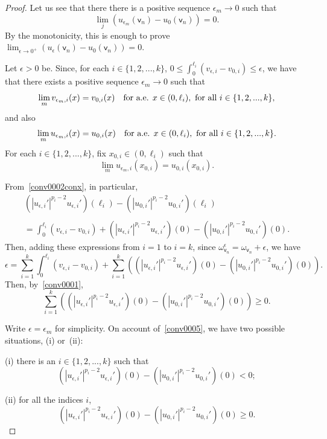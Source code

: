 \documentclass[reqno,12pt]{amsart}
\def\v{\mathsf{v}}	%
\numberwithin{equation}{section} %
\begin{document}
\begin{proof}
Let us see that there there is a positive sequence $\epsilon_{m}\to 0$ such that 
 $$\lim_{j}\left(u_{\epsilon_{m}}(\v_n)-u_0(\v_n)\right)=0.$$
By  the monotonicity, this is enough to prove $\lim_{\epsilon\to 0^+}\left(u_\epsilon(\v_n)-u_0(\v_n)\right)=0$.

Let $\epsilon>0$ be. Since, for each $i\in\{1,2,...,k\}$, $\displaystyle 0\le\int_0^{\ell_i} (v_{\epsilon,i} - v_{0,i})\le \epsilon$, we have that there exists  a positive sequence $  \epsilon_m\to 0$ such that  $$\lim_m v_{\epsilon_m,i}(x)= v_{0,i}(x)\quad\hbox{for a.e. } x\in (0,\ell_i),\ \hbox{for all } i\in\{1,2,...,k\},$$
and also
$$\lim_m u_{\epsilon_m,i}(x)= u_{0,i}(x)\quad\hbox{for a.e. } x\in (0,\ell_i), \ \hbox{for all } i\in\{1,2,...,k\}.$$
For each $i\in\{1,2,...,k\}$, fix $x_{0,i}\in (0,\ell_i)$ such that 
$$\lim_m u_{\epsilon_m,i}(x_{0,i})= u_{0,i}(x_{0,i}).$$

From~\eqref{conv0002conx}, in particular, 
\begin{equation}\label{conv0002}
\begin{array}{c}
\displaystyle
(|u_{\epsilon,i}'|^{p_i-2}u_{\epsilon,i}') (\ell_i) -  (|u_{0,i}'|^{p_i-2}u_{0,i}') (\ell_i)   
\\ \\
\displaystyle= \int_0^{\ell_i} (v_{\epsilon,i} - v_{0,i})+  (|u_{\epsilon,i}'|^{p_i-2}u_{\epsilon,i}') (0) -  (|u_{0,i}'|^{p_i-2}u_{0,i}') (0).
\end{array}
\end{equation}
Then, adding these expressions from $i=1$ to $i=k$,  since $\omega^\epsilon_{\v_n}=\omega_{\v_n}+\epsilon$, we have
$$\epsilon   
=\sum_{i=1}^k\int_0^{\ell_i} (v_{\epsilon,i} - v_{0,i})+ \sum_{i=1}^k\left( (|u_{\epsilon,i}'|^{p_i-2}u_{\epsilon,i}') (0) -  (|u_{0,i}'|^{p_i-2}u_{0,i}') (0)\right).$$
Then, by~\eqref{conv0001},  
\begin{equation}\label{conv0005}
\sum_{i=1}^k\left( (|u_{\epsilon,i}'|^{p_i-2}u_{\epsilon,i}') (0) -  (|u_{0,i}'|^{p_i-2}u_{0,i}') (0)\right)\ge 0.
\end{equation}


Write  $\epsilon=\epsilon_m$  for  simplicity. On account of~\eqref{conv0005}, we have two possible situations,  (i) or~(ii):

  \noindent  (i)     there is an $i\in\{1,2,...,k\}$ such that 
$$ (|u_{\epsilon,i}'|^{p_i-2}u_{\epsilon,i}') (0) -  (|u_{0,i}'|^{p_i-2}u_{0,i}') (0)< 0;$$

\noindent (ii) for all the  indices $i$,
$$ (|u_{\epsilon,i}'|^{p_i-2}u_{\epsilon,i}') (0) -  (|u_{0,i}'|^{p_i-2}u_{0,i}') (0)\ge  0.$$ 


\end{proof}
\end{document}
